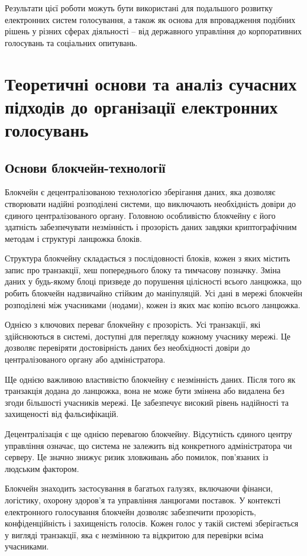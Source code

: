 \documentclass[14pt]{extreport}
\begin{document}
  Результати цієї роботи можуть бути використані для подальшого розвитку електронних систем голосування, а також як основа для впровадження подібних рішень у різних сферах діяльності – від державного управління до корпоративних голосувань та соціальних опитувань.
  
  \chapter{Теоретичні основи та аналіз сучасних підходів до організації електронних голосувань}
  
  \section{Основи блокчейн-технології}

  Блокчейн є децентралізованою технологією зберігання даних, яка дозволяє створювати надійні розподілені системи, що виключають необхідність довіри до єдиного централізованого органу. Головною особливістю блокчейну є його здатність забезпечувати незмінність і прозорість даних завдяки криптографічним методам і структурі ланцюжка блоків.

  Структура блокчейну складається з послідовності блоків, кожен з яких містить запис про транзакції, хеш попереднього блоку та тимчасову позначку. Зміна даних у будь-якому блоці призведе до порушення цілісності всього ланцюжка, що робить блокчейн надзвичайно стійким до маніпуляцій. Усі дані в мережі блокчейн розподілені між учасниками (нодами), кожен із яких має копію всього ланцюжка.

  Однією з ключових переваг блокчейну є прозорість. Усі транзакції, які здійснюються в системі, доступні для перегляду кожному учаснику мережі. Це дозволяє перевіряти достовірність даних без необхідності довіри до централізованого органу або адміністратора.

  Ще однією важливою властивістю блокчейну є незмінність даних. Після того як транзакція додана до ланцюжка, вона не може бути змінена або видалена без згоди більшості учасників мережі. Це забезпечує високий рівень надійності та захищеності від фальсифікацій.

  Децентралізація є ще однією перевагою блокчейну. Відсутність єдиного центру управління означає, що система не залежить від конкретного адміністратора чи серверу. Це значно знижує ризик зловживань або помилок, пов’язаних із людським фактором.

  Блокчейн знаходить застосування в багатьох галузях, включаючи фінанси, логістику, охорону здоров’я та управління ланцюгами поставок. У контексті електронного голосування блокчейн дозволяє забезпечити прозорість, конфіденційність і захищеність голосів. Кожен голос у такій системі зберігається у вигляді транзакції, яка є незмінною та відкритою для перевірки всіма учасниками.
\end{document}
